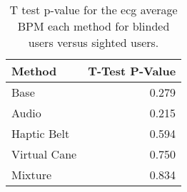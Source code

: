 
\begin{table}[!htb]
\centering
\caption{T test p-value for the ecg average BPM each method for blinded users versus sighted users.}
\label{tab:ttest_ecg_bpm}
\begin{tabular}{lr}
\toprule
      Method &  T-Test P-Value \\
\midrule
        Base &           0.279 \\
       Audio &           0.215 \\
 Haptic Belt &           0.594 \\
Virtual Cane &           0.750 \\
     Mixture &           0.834 \\
\bottomrule
\end{tabular}
\end{table}

